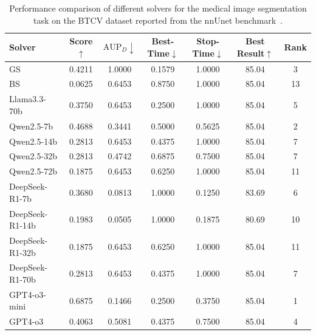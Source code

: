 \begin{table}[h]
    \centering
    \setlength{\tabcolsep}{3pt}
    \renewcommand\arraystretch{1.5}
    \caption{Performance comparison of different solvers for the medical image segmentation task on the BTCV dataset reported from the nnUnet benchmark~\cite{nnunet_revisit}.}
    \begin{tabular}{l|cccccc}
    \toprule
    Solver           & Score$\uparrow$ & $\text{AUP}_D\downarrow$ & Best-Time$\downarrow$ & Stop-Time$\downarrow$ & Best Result$\uparrow$ & Rank \\
    \midrule
    GS & 0.4211 & 1.0000 & 0.1579 & 1.0000 & 85.04 & 3 \\
    BS & 0.0625 & 0.6453 & 0.8750 & 1.0000 & 85.04 & 13 \\
    Llama3.3-70b & 0.3750 & 0.6453 & 0.2500 & 1.0000 & 85.04 & 5 \\
    Qwen2.5-7b & 0.4688 & 0.3441 & 0.5000 & 0.5625 & 85.04 & 2 \\
    Qwen2.5-14b & 0.2813 & 0.6453 & 0.4375 & 1.0000 & 85.04 & 7 \\
    Qwen2.5-32b & 0.2813 & 0.4742 & 0.6875 & 0.7500 & 85.04 & 7 \\
    Qwen2.5-72b & 0.1875 & 0.6453 & 0.6250 & 1.0000 & 85.04 & 11 \\
    DeepSeek-R1-7b & 0.3680 & 0.0813 & 1.0000 & 0.1250 & 83.69 & 6 \\
    DeepSeek-R1-14b & 0.1983 & 0.0505 & 1.0000 & 0.1875 & 80.69 & 10 \\
    DeepSeek-R1-32b & 0.1875 & 0.6453 & 0.6250 & 1.0000 & 85.04 & 11 \\
    DeepSeek-R1-70b & 0.2813 & 0.6453 & 0.4375 & 1.0000 & 85.04 & 7 \\
    GPT4-o3-mini & 0.6875 & 0.1466 & 0.2500 & 0.3750 & 85.04 & 1 \\
    GPT4-o3 & 0.4063 & 0.5081 & 0.4375 & 0.7500 & 85.04 & 4 \\
    \bottomrule
    \end{tabular}
    \label{tab:MIABench}
\end{table}



